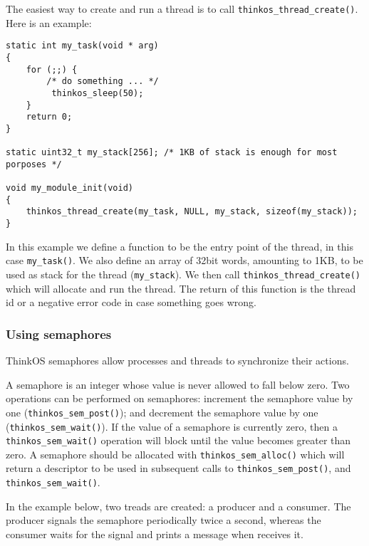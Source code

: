 The easiest way to create and run a thread is to call \lstinline{thinkos_thread_create()}. Here is an example: 

\begin{lstlisting}[caption={Simple Thread Create Example},label={lst:example1},language=C99,frame=single]
static int my_task(void * arg)
{
    for (;;) {
        /* do something ... */
         thinkos_sleep(50);
    }
    return 0;
}

static uint32_t my_stack[256]; /* 1KB of stack is enough for most porposes */

void my_module_init(void)
{
    thinkos_thread_create(my_task, NULL, my_stack, sizeof(my_stack));
}
\end{lstlisting}

In this example we define a function to be the entry point of the thread, in this case \lstinline{my_task()}. We also define an array of 32bit words, amounting to 1KB, to be used as stack for the thread (\lstinline{my_stack}). We then call \lstinline{thinkos_thread_create()} which will allocate and run the thread. The return of this function is the thread id or a negative error code in case something goes wrong.

\subsubsection{Using semaphores}

ThinkOS semaphores allow processes and threads to synchronize their actions.

A semaphore is an integer whose value is never allowed to fall below zero. Two operations can be performed on semaphores: increment the semaphore value by one (\lstinline{thinkos_sem_post()}); and decrement the semaphore value by one (\lstinline{thinkos_sem_wait()}). If the value of a semaphore is currently zero, then a \lstinline{thinkos_sem_wait()} operation will block until the value becomes greater than zero. A semaphore should be allocated with \lstinline{thinkos_sem_alloc()} which will return a descriptor to be used in subsequent calls to  \lstinline{thinkos_sem_post()}, and \lstinline{thinkos_sem_wait()}.

In the example below, two treads are created: a producer and a consumer. The producer signals the semaphore periodically twice a second, whereas the consumer waits for the signal and prints a message when receives it.


